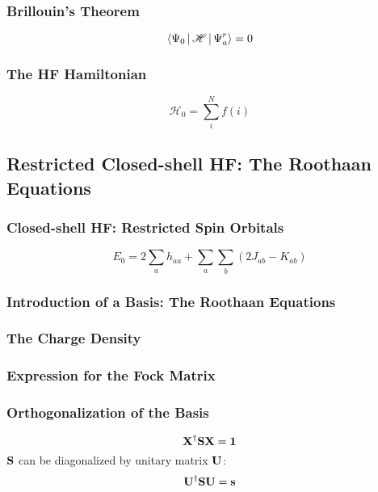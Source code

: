 \documentclass[a4paper]{article}
\newcommand{\iden}{{\large \bm{1}}}
\numberwithin{equation}{section}
\begin{document}
\subsubsection{Brillouin's Theorem}
\begin{equation}\label{key}
\Braket{\Psi_0 | \mathscr{H} | \Psi_a^r} = 0
\end{equation}

\subsubsection{The HF Hamiltonian}
\begin{equation}\label{key}
\mathscr{H}_0 = \sum_i^N f(i) 
\end{equation}

\subsection{Restricted Closed-shell HF: The Roothaan Equations}
\subsubsection{Closed-shell HF: Restricted Spin Orbitals}
\begin{equation}\label{key}
E_0 = 2\sum_a h_{aa} + \sum_a\sum_b(2J_{ab} - K_{ab})
\end{equation}

\subsubsection{Introduction of a Basis: The Roothaan Equations}

\subsubsection{The Charge Density}

\subsubsection{Expression for the Fock Matrix}

\subsubsection{Orthogonalization of the Basis}
\begin{equation}\label{key}
\vb{X}^\dagger \vb{S} \vb{X} = \iden
\end{equation}
$ \vb{S} $ can be diagonalized by unitary matrix $ \vb{U} $:
\begin{equation}\label{key}
\vb{U}^\dagger \vb{S} \vb{U} = \vb{s}
\end{equation}
\end{document}
